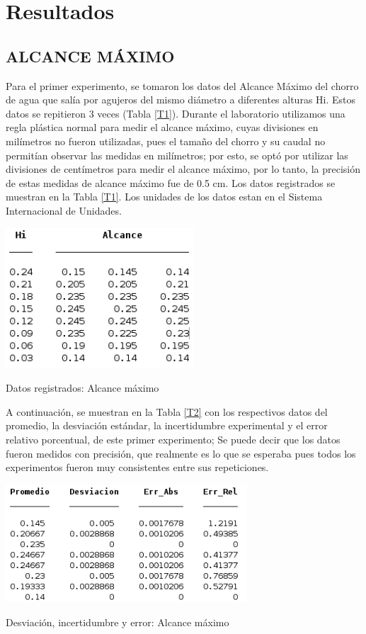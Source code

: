 \documentclass[journal,transmag]{IEEEtran}
\begin{document}
\section{Resultados}
\subsection{ALCANCE MÁXIMO}
Para el primer experimento, se tomaron los datos del Alcance Máximo del chorro de agua que salía por agujeros del mismo diámetro a diferentes alturas Hi. Estos datos se repitieron 3 veces (Tabla \ref{T1}). Durante el laboratorio utilizamos una regla plástica normal para medir el alcance máximo, cuyas divisiones en milímetros no fueron utilizadas, pues el tamaño del chorro y su caudal no permitían observar las medidas en milímetros; por esto, se optó por utilizar las divisiones de centímetros para medir el alcance máximo, por lo tanto, la precisión de estas medidas de alcance máximo fue de 0.5 cm. Los datos registrados se muestran en la Tabla \ref{T1}.  Los unidades de los datos estan en el Sistema Internacional de Unidades. 

\begin{table}[!h]
\center
\includegraphics[width=7cm]{tabla1.png}
\caption{Datos registrados: Alcance máximo}
\label{T1}
\end{table}

A continuación, se muestran en la Tabla \ref{T2} con los respectivos datos del promedio, la desviación estándar, la incertidumbre experimental y el error relativo porcentual, de este primer experimento; Se puede decir que los datos fueron medidos con precisión, que realmente es lo que se esperaba pues todos los experimentos fueron muy consistentes entre sus repeticiones. 

\begin{table}[!h]
\center
\includegraphics[width=9cm]{tabla2.png}
\caption{Desviación, incertidumbre y error: Alcance máximo}
\label{T2}
\end{table}
\end{document}
